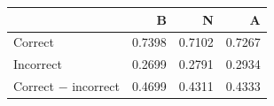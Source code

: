 \begin{tabular}{lrrr}\toprule
 & B & N & A\\\midrule
Correct & 0.7398 & 0.7102 & 0.7267 \\
Incorrect & 0.2699 & 0.2791 & 0.2934 \\
Correct $-$ incorrect & 0.4699 & 0.4311 & 0.4333 \\
\bottomrule\end{tabular}
